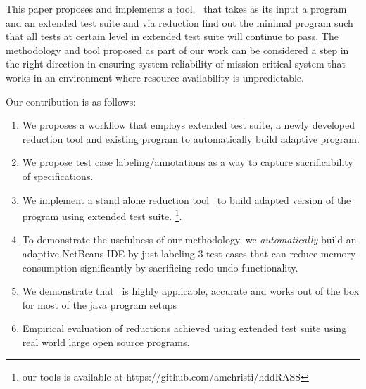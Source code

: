 This paper proposes and implements a tool, \mytool\ that takes as its input a program and an extended test suite and via reduction find out the minimal program such that all tests at certain level in extended test suite will continue to pass. The methodology and tool proposed as part of our work can be considered a step in the right direction in ensuring system reliability of mission critical system that works in an environment where resource availability is unpredictable. %

Our contribution is as follows: 
\begin{enumerate}
\item We proposes a workflow that employs extended test suite, a newly developed reduction tool and existing program to automatically build adaptive program.
\item We propose test case labeling/annotations as a way to capture sacrificability of specifications.
\item We implement a stand alone reduction tool \mytool\, to build adapted version of the program using extended test suite. \footnote{our tools is available at https://github.com/amchristi/hddRASS}.
\item To demonstrate the usefulness of our methodology, we \emph{automatically} build an adaptive NetBeans IDE by just labeling 3 test cases that can reduce memory consumption significantly by sacrificing redo-undo functionality.
\item We demonstrate that \mytool\ is highly applicable, accurate and works out of the box for most of the java program setups
\item Empirical evaluation of reductions achieved using extended test suite using real world large open source programs.
\end{enumerate}      


